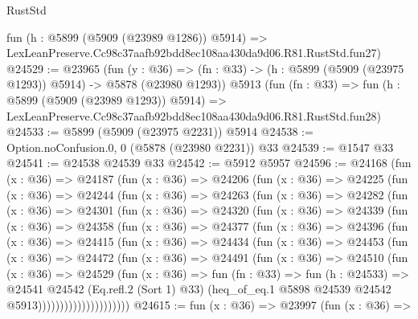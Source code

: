 \begin{lexlean}{RustStd}
\begin{coremodule}
{{    fun (h : @5899 (@5909 (@23989 @1286)) @5914) =>
    LexLeanPreserve.Cc98c37aafb92bdd8ec108aa430da9d06.R81.RustStd.fun27)
@24529 := @23965
    (fun (y : @36) =>
    (fn : @33) -> (h : @5899 (@5909 (@23975 @1293)) @5914) -> @5878 (@23980 @1293))
    @5913
    (fun (fn : @33) =>
    fun (h : @5899 (@5909 (@23989 @1293)) @5914) =>
    LexLeanPreserve.Cc98c37aafb92bdd8ec108aa430da9d06.R81.RustStd.fun28)
@24533 := @5899 (@5909 (@23975 @2231)) @5914
@24538 := Option.noConfusion.{0, 0} (@5878 (@23980 @2231)) @33
@24539 := @1547 @33
@24541 := @24538 @24539 @33
@24542 := @5912 @5957
@24596 := @24168
    (fun (x : @36) =>
    @24187
      (fun (x : @36) =>
      @24206
        (fun (x : @36) =>
        @24225
          (fun (x : @36) =>
          @24244
            (fun (x : @36) =>
            @24263
              (fun (x : @36) =>
              @24282
                (fun (x : @36) =>
                @24301
                  (fun (x : @36) =>
                  @24320
                    (fun (x : @36) =>
                    @24339
                      (fun (x : @36) =>
                      @24358
                        (fun (x : @36) =>
                        @24377
                          (fun (x : @36) =>
                          @24396
                            (fun (x : @36) =>
                            @24415
                              (fun (x : @36) =>
                              @24434
                                (fun (x : @36) =>
                                @24453
                                  (fun (x : @36) =>
                                  @24472
                                    (fun (x : @36) =>
                                    @24491
                                      (fun (x : @36) =>
                                      @24510
                                        (fun (x : @36) =>
                                        @24529
                                          (fun (x : @36) =>
                                          fun (fn : @33) =>
                                          fun (h : @24533) =>
                                          @24541
                                            @24542
                                            (Eq.refl.{2} (Sort 1) @33)
                                            (heq_of_eq.{1}
                                              @5898
                                              @24539
                                              @24542
                                              @5913)))))))))))))))))))))
@24615 := fun (x : @36) =>
  @23997
    (fun (x : @36) =>
}}
\end{coremodule}
\end{lexlean}
